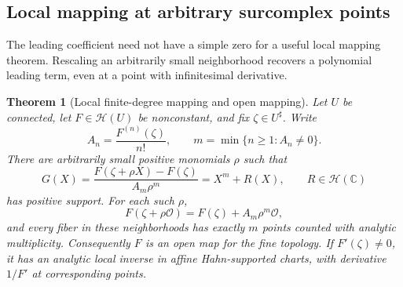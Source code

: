 \documentclass[11pt,letterpaper]{article}
\numberwithin{equation}{section}
\newtheorem{theorem}{Theorem}[section]
\theoremstyle{definition}
\theoremstyle{remark}
\newcommand{\C}{\mathbb{C}}
\newcommand{\OO}{\mathcal{O}}
\newcommand{\HH}{\mathcal{H}}
\begin{document}
\subsection{Local mapping at arbitrary surcomplex points}

The leading coefficient need not have a simple zero for a useful local
mapping theorem. Rescaling an arbitrarily small neighborhood recovers a
polynomial leading term, even at a point with infinitesimal derivative.

\begin{theorem}[Local finite-degree mapping and open mapping]\label{thm:openmapping}
Let $U$ be connected, let $F\in\HH(U)$ be nonconstant, and fix
$\zeta\in U^\sharp$. Write
\[
 A_n=\frac{F^{(n)}(\zeta)}{n!},
 \qquad m=\min\{n\ge1:A_n\ne0\}.
\]
There are arbitrarily small positive monomials $\rho$ such that
\begin{equation}\label{eq:localnormalization}
 G(X)=\frac{F(\zeta+\rho X)-F(\zeta)}{A_m\rho^m}
      =X^m+R(X),\qquad R\in\HH(\C)
\end{equation}
has positive support. For each such $\rho$,
\[
 F(\zeta+\rho\OO)=F(\zeta)+A_m\rho^m\OO,
\]
and every fiber in these neighborhoods has exactly $m$ points counted with
analytic multiplicity. Consequently $F$ is an open map for the fine
topology. If $F'(\zeta)\ne0$, it has an analytic local inverse in affine
Hahn-supported charts, with derivative $1/F'$ at corresponding points.
\end{theorem}
\end{document}
